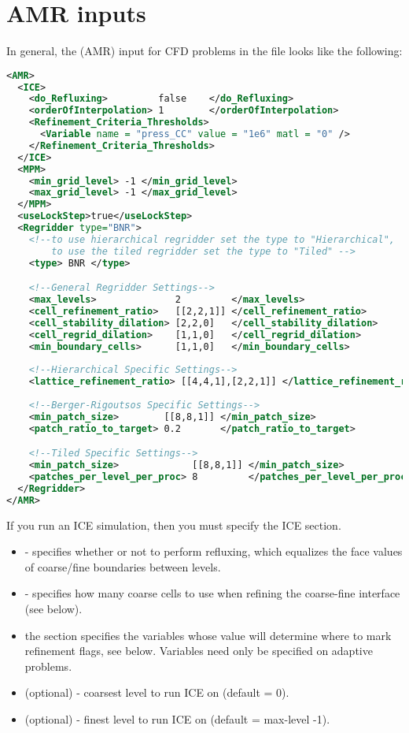 \section{AMR inputs}
In general, the  (AMR) input for CFD problems
in the  file looks like the following:
\begin{lstlisting}[language=XML]
<AMR>
  <ICE>
    <do_Refluxing>         false    </do_Refluxing>
    <orderOfInterpolation> 1        </orderOfInterpolation>
    <Refinement_Criteria_Thresholds>
      <Variable name = "press_CC" value = "1e6" matl = "0" />
    </Refinement_Criteria_Thresholds>
  </ICE>
  <MPM>
    <min_grid_level> -1 </min_grid_level>
    <max_grid_level> -1 </max_grid_level>
  </MPM>
  <useLockStep>true</useLockStep>    
  <Regridder type="BNR">
    <!--to use hierarchical regridder set the type to "Hierarchical", 
        to use the tiled regridder set the type to "Tiled" -->
    <type> BNR </type>

    <!--General Regridder Settings-->
    <max_levels>              2         </max_levels>
    <cell_refinement_ratio>   [[2,2,1]] </cell_refinement_ratio>
    <cell_stability_dilation> [2,2,0]   </cell_stability_dilation>
    <cell_regrid_dilation>    [1,1,0]   </cell_regrid_dilation>
    <min_boundary_cells>      [1,1,0]   </min_boundary_cells>
        
    <!--Hierarchical Specific Settings-->
    <lattice_refinement_ratio> [[4,4,1],[2,2,1]] </lattice_refinement_ratio>
        
    <!--Berger-Rigoutsos Specific Settings-->
    <min_patch_size>        [[8,8,1]] </min_patch_size>
    <patch_ratio_to_target> 0.2       </patch_ratio_to_target>

    <!--Tiled Specific Settings-->
    <min_patch_size>             [[8,8,1]] </min_patch_size>
    <patches_per_level_per_proc> 8         </patches_per_level_per_proc>         
  </Regridder>
</AMR>
\end{lstlisting}
If you run an ICE simulation, then you must specify the ICE section. 
\begin{itemize}
\item {} - specifies whether or not to perform refluxing,
  which equalizes the face values of coarse/fine boundaries between
  levels.
\item {} - specifies how many coarse cells to use
  when refining the coarse-fine interface (see below).
\item the  section specifies the
  variables whose value will determine where to mark refinement flags,
  see below. Variables need only be specified on adaptive problems.
\item {} (optional) - coarsest level to run ICE on
  (default = 0).
\item {} (optional) - finest level to run ICE on (default
  = max-level -1).

\end{itemize}

